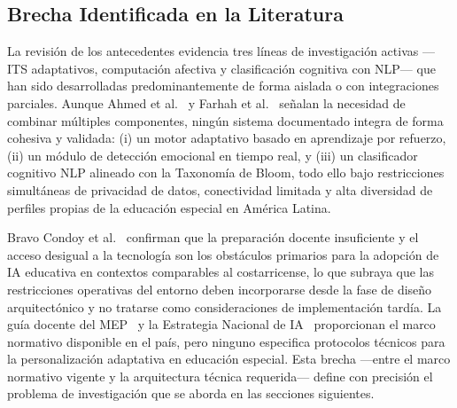 \subsection{Brecha Identificada en la Literatura}

La revisión de los antecedentes evidencia tres líneas de investigación activas
---ITS adaptativos, computación afectiva y clasificación cognitiva con NLP--- que
han sido desarrolladas predominantemente de forma aislada o con integraciones
parciales. Aunque Ahmed et al.~\cite{Ahmed2025} y Farhah et al.~\cite{Farhah2025}
señalan la necesidad de combinar múltiples componentes, ningún sistema documentado
integra de forma cohesiva y validada: (i) un motor adaptativo basado en
aprendizaje por refuerzo, (ii) un módulo de detección emocional en tiempo real,
y (iii) un clasificador cognitivo NLP alineado con la Taxonomía de Bloom, todo
ello bajo restricciones simultáneas de privacidad de datos, conectividad limitada
y alta diversidad de perfiles propias de la educación especial en América Latina.

Bravo Condoy et al.~\cite{BravoCondoy2025} confirman que la preparación docente
insuficiente y el acceso desigual a la tecnología son los obstáculos primarios
para la adopción de IA educativa en contextos comparables al costarricense, lo
que subraya que las restricciones operativas del entorno deben incorporarse desde
la fase de diseño arquitectónico y no tratarse como consideraciones de
implementación tardía. La guía docente del MEP~\cite{MEP2026} y la Estrategia
Nacional de IA~\cite{MICITT2024} proporcionan el marco normativo disponible en
el país, pero ninguno especifica protocolos técnicos para la personalización
adaptativa en educación especial. Esta brecha ---entre el marco normativo vigente
y la arquitectura técnica requerida--- define con precisión el problema de
investigación que se aborda en las secciones siguientes.
